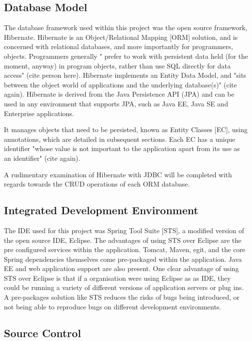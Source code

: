 \subsection{Database Model}

The database framework used within this project was the open source framework, Hibernate. Hibernate is an Object/Relational Mapping [ORM] solution, and is concerned with relational databases, and more importantly for programmers, objects. Programmers generally " prefer to work with persistent data held (for the moment, anyway) in program objects, rather than use SQL directly for data access" (cite person here). Hibernate implements an Entity Data Model, and "sits between the object world of applications and the underlying database(s)" (cite again). Hibernate is derived from the Java Persistence API (JPA) and can be used in any environment that supports JPA, such as Java EE, Java SE and Enterprise applications.

It manages objects that need to be persisted, known as Entity Classes [EC], using annotations, which are detailed in subsequent sections. Each EC has a unique identifier "whose value is not important to the application apart from its use as an identifier" (cite again). 

A rudimentary examination of Hibernate with JDBC will be completed with regards towards the CRUD operations of each ORM database.

\subsection{Integrated Development Environment}

The IDE used for this project was Spring Tool Suite [STS], a modified version of the open source IDE, Eclipse. The advantages of using STS over Eclipse are the pre configured services within the application. Tomcat, Maven, egit, and the core Spring dependencies themselves come pre-packaged within the application. Java EE and web application support are also present. One clear advantage of using STS over Eclipse is that if a organisation were using Eclipse as as IDE, they could be running a variety of different versions of application servers or plug ins. A pre-packages solution like STS reduces the risks of bugs being introduced, or not being able to reproduce bugs on different development environments.

\subsection{Source Control}

